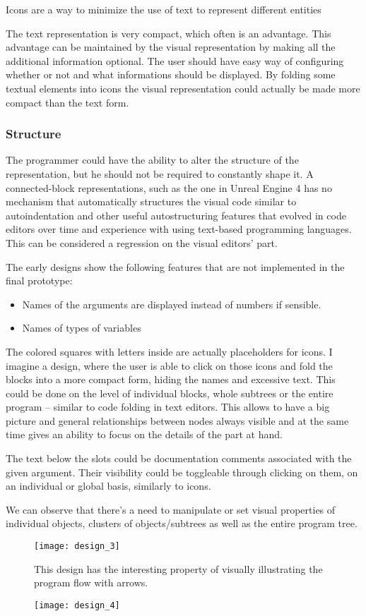 Icons are a way to minimize the use of text to represent different entities

The text representation is very compact, which often is an advantage. This
advantage can be maintained by the visual representation by making all the
additional information optional. The user should have easy way of configuring
whether or not and what informations should be displayed. By folding some
textual elements into icons the visual representation could actually be made
more compact than the text form.

\subsubsection{Structure}
The programmer could have the ability to alter the structure of the
representation, but he should not be required to constantly shape it. A
connected-block representations, such as the one in Unreal Engine 4 has no
mechanism that automatically structures the visual code similar to
autoindentation and other useful autostructuring features that evolved in code
editors over time and experience with using text-based programming
languages. This can be considered a regression on the visual editors' part.

The early designs show the following features that are not implemented in the
final prototype:
\begin{itemize}
	\item Names of the arguments are displayed instead of numbers if
          sensible.
	\item Names of types of variables
\end{itemize}

The colored squares with letters inside are actually placeholders for icons.  I
imagine a design, where the user is able to click on those icons and fold the
blocks into a more compact form, hiding the names and excessive text. This could
be done on the level of individual blocks, whole subtrees or the entire program
-- similar to code folding in text editors. This allows to have a big picture
and general relationships between nodes always visible and at the same time
gives an ability to focus on the details of the part at hand.

The text below the slots could be documentation comments associated with the
given argument. Their visibility could be toggleable through clicking on them,
on an individual or global basis, similarly to icons.

We can observe that there's a need to manipulate or set visual properties of
individual objects, clusters of objects/subtrees as well as the entire program
tree.


\begin{figure}[h!]
\centering \texttt{[image: design\_3]}
\caption{This design has the interesting property of visually illustrating the
  program flow with arrows.}
\label{fig:design_3}
\end{figure}


\begin{figure}[h!]
\centering \texttt{[image: design\_4]}
\caption{}
\label{fig:design_4}
\end{figure}

